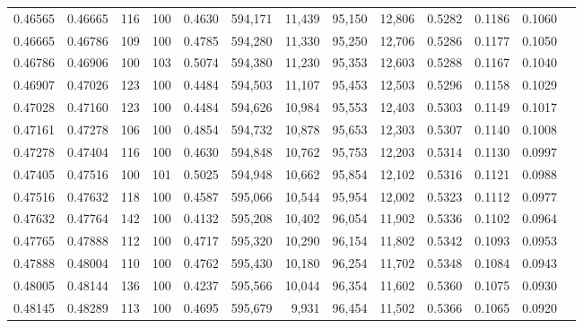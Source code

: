 \begin{tabular}{rrrrrrrrrrrrr}
0.46565 & 0.46665 &   116 & 100 &                                     0.4630 & 594,171 &  11,439 &  95,150 &  12,806 & 0.5282 & 0.1186 & 0.1060 \\
0.46665 & 0.46786 &   109 & 100 &                                     0.4785 & 594,280 &  11,330 &  95,250 &  12,706 & 0.5286 & 0.1177 & 0.1050 \\
0.46786 & 0.46906 &   100 & 103 &                                     0.5074 & 594,380 &  11,230 &  95,353 &  12,603 & 0.5288 & 0.1167 & 0.1040 \\
0.46907 & 0.47026 &   123 & 100 &                                     0.4484 & 594,503 &  11,107 &  95,453 &  12,503 & 0.5296 & 0.1158 & 0.1029 \\
0.47028 & 0.47160 &   123 & 100 &                                     0.4484 & 594,626 &  10,984 &  95,553 &  12,403 & 0.5303 & 0.1149 & 0.1017 \\
0.47161 & 0.47278 &   106 & 100 &                                     0.4854 & 594,732 &  10,878 &  95,653 &  12,303 & 0.5307 & 0.1140 & 0.1008 \\
0.47278 & 0.47404 &   116 & 100 &                                     0.4630 & 594,848 &  10,762 &  95,753 &  12,203 & 0.5314 & 0.1130 & 0.0997 \\
0.47405 & 0.47516 &   100 & 101 &                                     0.5025 & 594,948 &  10,662 &  95,854 &  12,102 & 0.5316 & 0.1121 & 0.0988 \\
0.47516 & 0.47632 &   118 & 100 &                                     0.4587 & 595,066 &  10,544 &  95,954 &  12,002 & 0.5323 & 0.1112 & 0.0977 \\
0.47632 & 0.47764 &   142 & 100 &                                     0.4132 & 595,208 &  10,402 &  96,054 &  11,902 & 0.5336 & 0.1102 & 0.0964 \\
0.47765 & 0.47888 &   112 & 100 &                                     0.4717 & 595,320 &  10,290 &  96,154 &  11,802 & 0.5342 & 0.1093 & 0.0953 \\
0.47888 & 0.48004 &   110 & 100 &                                     0.4762 & 595,430 &  10,180 &  96,254 &  11,702 & 0.5348 & 0.1084 & 0.0943 \\
0.48005 & 0.48144 &   136 & 100 &                                     0.4237 & 595,566 &  10,044 &  96,354 &  11,602 & 0.5360 & 0.1075 & 0.0930 \\
0.48145 & 0.48289 &   113 & 100 &                                     0.4695 & 595,679 &   9,931 &  96,454 &  11,502 & 0.5366 & 0.1065 & 0.0920 \\

\end{tabular}
